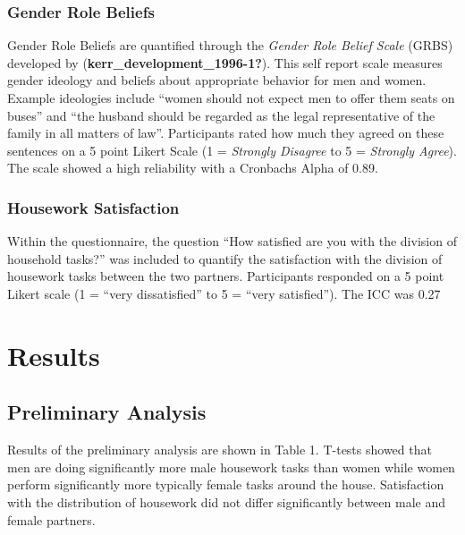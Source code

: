 \documentclass[
  man,floatsintext]{apa6}
\begin{document}
\hypertarget{gender-role-beliefs}{%
\subsubsection{Gender Role Beliefs}\label{gender-role-beliefs}}

Gender Role Beliefs are quantified through the \emph{Gender Role Belief Scale} (GRBS) developed by (\textbf{kerr\_development\_1996-1?}). This self report scale measures gender ideology and beliefs about appropriate behavior for men and women. Example ideologies include ``women should not expect men to offer them seats on buses'' and ``the husband should be regarded as the legal representative of the family in all matters of law''. Participants rated how much they agreed on these sentences on a 5 point Likert Scale (1 = \emph{Strongly Disagree} to 5 = \emph{Strongly Agree}). The scale showed a high reliability with a Cronbachs Alpha of 0.89.

\hypertarget{housework-satisfaction}{%
\subsubsection{Housework Satisfaction}\label{housework-satisfaction}}

Within the questionnaire, the question ``How satisfied are you with the division of household tasks?'' was included to quantify the satisfaction with the division of housework tasks between the two partners. Participants responded on a 5 point Likert scale (1 = ``very dissatisfied'' to 5 = ``very satisfied''). The ICC was 0.27

\hypertarget{results}{%
\section{Results}\label{results}}

\hypertarget{preliminary-analysis}{%
\subsection{Preliminary Analysis}\label{preliminary-analysis}}

Results of the preliminary analysis are shown in Table 1. T-tests showed that men are doing significantly more male housework tasks than women while women perform significantly more typically female tasks around the house. Satisfaction with the distribution of housework did not differ significantly between male and female partners.
\end{document}
